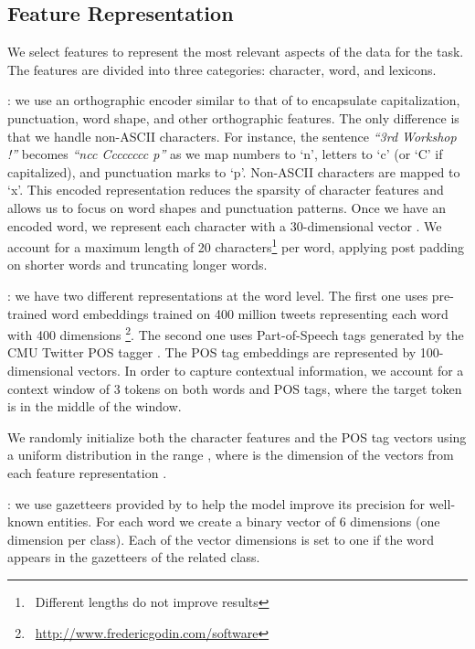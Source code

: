 \documentclass[11pt,letterpaper]{article}
\begin{document}
\subsection{Feature Representation} \label{feature_rep}

We select features to represent the most relevant aspects of the data for the task. The features are divided into three categories: character, word, and lexicons.

: we use an orthographic encoder similar to that of \citet{limsopatham2016_wnut_ner} to encapsulate capitalization, punctuation, word shape, and other orthographic features. The only difference is that we handle non-ASCII characters. For instance, the sentence \emph{``3rd Workshop !''} becomes \emph{``ncc Cccccccc p''} as we map numbers to `n', letters to `c' (or `C' if capitalized), and punctuation marks to `p'. Non-ASCII characters are mapped to `x'. This encoded representation reduces the sparsity of character features and allows us to focus on word shapes and punctuation patterns. Once we have an encoded word, we represent each character with a 30-dimensional vector \cite{DBLP:journals/corr/MaH16}. We account for a maximum length of 20 characters\footnote{~Different lengths do not improve results} per word, applying post padding on shorter words and truncating longer words.

: we have two different representations at the word level. The first one uses pre-trained word embeddings trained on 400 million tweets representing each word with 400 dimensions \cite{godin2015multimedia}\footnote{~\url{http://www.fredericgodin.com/software}}. The second one uses Part-of-Speech tags generated by the CMU Twitter POS tagger \cite{owoputi2013improved}. The POS tag embeddings are represented by 100-dimensional vectors. In order to capture contextual information, we account for a context window of 3 tokens on both words and POS tags, where the target token is in the middle of the window.

We randomly initialize both the character features and the POS tag vectors using a uniform distribution in the range , where  is the dimension of the vectors from each feature representation \cite{he2015delving}.

: we use gazetteers provided by \citet{mishra2016_wnut_ner} to help the model improve its precision for well-known entities. For each word we create a binary vector of 6 dimensions (one dimension per class). Each of the vector dimensions is set to one if the word appears in the gazetteers of the related class.
\end{document}

